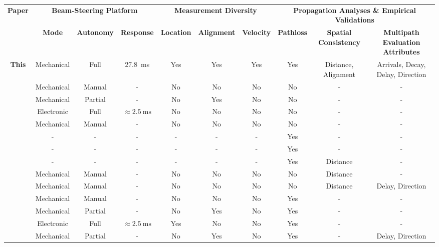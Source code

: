 \documentclass[10pt, twocolumn]{IEEEtran}
\begin{document}
\begin{table}
    \centering
    \scriptsize
    \begin{tabular}{|*{10}{c|}}
    \hline
    \multirow{2}{*}{\bf{Paper}} &
	\multicolumn{3}{c|}{\bf{Beam-Steering Platform}} &
    \multicolumn{3}{c|}{\bf{Measurement Diversity}} &
    \multicolumn{3}{c|}{\bf{Propagation Analyses \& Empirical Validations}}\\ &
    \bf{Mode} &
	\bf{Autonomy} &
   	\bf{Response} &
	\bf{Location} & 
    \bf{Alignment} &
    \bf{Velocity} &
    \bf{Pathloss} &
    \bf{Spatial Consistency} &
	\bf{Multipath Evaluation Attributes}\\
    \hline
	\bf{This} & Mechanical & Full & \SI{27.8}{\milli\second} & Yes & Yes & Yes & Yes & Distance, Alignment & Arrivals, Decay, Delay, Direction\\
	\hline
   ~\cite{Purdue} & Mechanical & Manual & - & No & No & No & No & - & -\\
    \hline
   ~\cite{Foliage} & Mechanical & Partial & - & No & Yes & No & No & - & -\\
    \hline
   ~\cite{AgileLink} & Electronic & Full & ${\approx}\SI{2.5}{\milli\second}$ & No & No & No & No & - & -\\
    \hline
   ~\cite{Harvard} & Mechanical & Manual & - & No & No & No & No & - & -\\
    \hline
   ~\cite{Qualcomm3GPP} & - & - & - & - & - & - & Yes & - & -\\
    \hline
   ~\cite{MacCartneyModelsOverview} & - & - & - & - & - & - & Yes & - & -\\
    \hline
   ~\cite{MacCartneyRural} & - & - & - & - & - & - & Yes & Distance & -\\
    \hline
   ~\cite{SpatialConsistencyOriginal} & Mechanical & Manual & - & No & No & No & No & Distance & -\\
    \hline
   ~\cite{SpatialDynamics} & Mechanical & Manual & - & No & No & No & No & Distance & Delay, Direction\\
    \hline
   ~\cite{SuburbanGeometryJournal} & Mechanical & Manual & - & No & No & No & Yes & - & -\\
    \hline
   ~\cite{FoliageSimulations} & Mechanical & Partial & - & No & Yes & No & Yes & - & -\\
    \hline
   ~\cite{Outdoor28G} & Electronic & Full & ${\approx}\SI{2.5}{\milli\second}$ & Yes & No & No & Yes & - & -\\
    \hline
   ~\cite{PDAPs} & Mechanical & Partial & - & No & Yes & No & Yes & - & Delay, Direction\\

\end{tabular}
\end{table}
\end{document}
